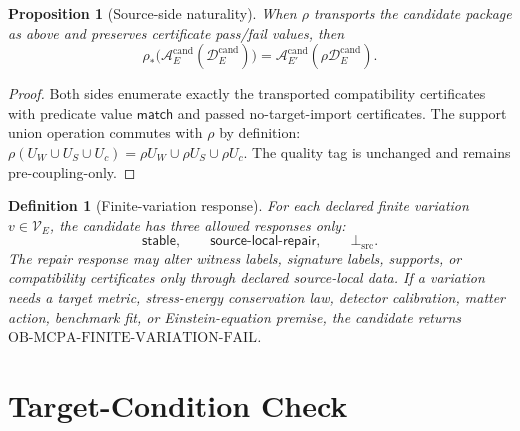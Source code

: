 \documentclass[11pt]{article}
\newcommand{\BottomSrc}{\bot_{\mathrm{src}}}
\newtheorem{definition}{Definition}
\newtheorem{proposition}{Proposition}
\begin{document}
\begin{proposition}[Source-side naturality]
When \(\rho\) transports the candidate package as above and preserves
certificate pass/fail values, then
\[
  \rho_*\bigl(\mathcal{A}^{\mathrm{cand}}_E(\mathcal{D}^{\mathrm{cand}}_E)\bigr)
  =
  \mathcal{A}^{\mathrm{cand}}_{E'}(\rho\mathcal{D}^{\mathrm{cand}}_E).
\]
\end{proposition}

\begin{proof}
Both sides enumerate exactly the transported compatibility certificates with
predicate value \(\mathsf{match}\) and passed no-target-import certificates.
The support union operation commutes with \(\rho\) by definition:
\(\rho(U_W\cup U_S\cup U_c)=\rho U_W\cup\rho U_S\cup\rho U_c\). The quality
tag is unchanged and remains pre-coupling-only.
\end{proof}

\begin{definition}[Finite-variation response]
For each declared finite variation \(v\in\mathcal{V}_E\), the candidate has
three allowed responses only:
\[
  \mathsf{stable},\qquad
  \mathsf{source\text{-}local\text{-}repair},\qquad
  \BottomSrc.
\]
The repair response may alter witness labels, signature labels, supports, or
compatibility certificates only through declared source-local data. If a
variation needs a target metric, stress-energy conservation law, detector
calibration, matter action, benchmark fit, or Einstein-equation premise, the
candidate returns
\(\mathrm{OB\text{-}MCPA\text{-}FINITE\text{-}VARIATION\text{-}FAIL}\).
\end{definition}

\section{Target-Condition Check}
\end{document}
